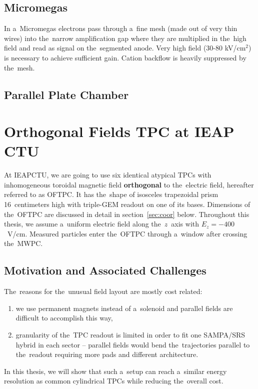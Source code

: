 		\subsection{Micromegas}
			In a~\ac{Micromegas} electrons pass through a~fine mesh (made out of very thin wires) into the~narrow amplification gap where they are multiplied in the~high field and read as signal on the~segmented anode. Very high field (30-80 kV/cm$^2$) is necessary to achieve sufficient gain. Cation backflow is heavily suppressed by the~mesh.
			
		\subsection{Parallel Plate Chamber}
			
			
	
	\section{Orthogonal Fields TPC at IEAP CTU}
	\label{sec:oftpc}
		At \ac{IEAPCTU}, we are going to use six identical atypical \ac{TPC}s with inhomogeneous toroidal magnetic field \textbf{orthogonal} to the~electric field, hereafter referred to as \acf{OFTPC}. It has the~shape of isosceles trapezoidal prism 16~centimeters high with triple\nobreakdash-\ac{GEM} readout on one of its bases. Dimensions of the~\ac{OFTPC} are discussed in detail in section~\ref{sec:coor} below. Throughout this thesis, we assume a~uniform electric field along the~$z$~axis with $E_z = -400$~V/cm. Measured particles enter the~\ac{OFTPC} through a~window after crossing the~\ac{MWPC}.
		
		
		\subsection{Motivation and Associated Challenges}
			The~reasons for the~unusual field layout are mostly cost related:
				\begin{enumerate}[nosep,label=\alph*)]
					\item we use permanent magnets instead of a~solenoid and parallel fields are difficult to accomplish this way,
					\item granularity of the~\ac{TPC} readout is limited in order to fit one SAMPA/SRS hybrid in each sector -- parallel fields would bend the~trajectories parallel to the~readout requiring more pads and different architecture.
				\end{enumerate}
			In this thesis, we will show that such a~setup can reach a~similar energy resolution as common cylindrical \ac{TPC}s while reducing the~overall cost.
			
